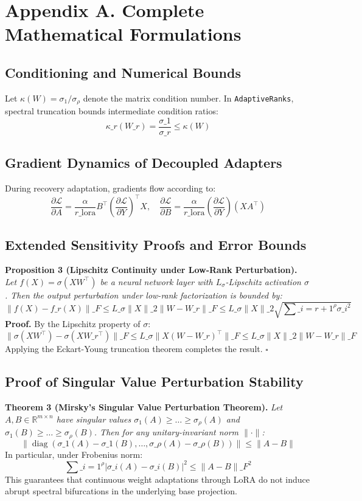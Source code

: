 \section*{Appendix A. Complete Mathematical Formulations}

\subsection*{Conditioning and Numerical Bounds}
Let $\kappa(W) = \sigma_1 / \sigma_\rho$ denote the matrix condition number. In \texttt{AdaptiveRanks}, spectral truncation bounds intermediate condition ratios:
\[
\kappa\_r(W\_r) = \frac{\sigma\_1}{\sigma\_r} \le \kappa(W)
\]

\subsection*{Gradient Dynamics of Decoupled Adapters}
During recovery adaptation, gradients flow according to:
\[
\frac{\partial \mathcal{L}}{\partial A} = \frac{\alpha}{r\_{\text{lora}}} B^\top \left( \frac{\partial \mathcal{L}}{\partial Y} \right)^\top X, \quad \frac{\partial \mathcal{L}}{\partial B} = \frac{\alpha}{r\_{\text{lora}}} \left( \frac{\partial \mathcal{L}}{\partial Y} \right) (X A^\top)
\]

\subsection*{Extended Sensitivity Proofs and Error Bounds}
\textbf{Proposition 3 (Lipschitz Continuity under Low-Rank Perturbation).} \textit{Let $f(X) = \sigma(X W^\top)$ be a neural network layer with $L_\sigma$-Lipschitz activation $\sigma$. Then the output perturbation under low-rank factorization is bounded by:}
\[
\|f(X) - f\_r(X)\|\_F \le L\_\sigma \|X\|\_2 \|W - W\_r\|\_F \le L\_\sigma \|X\|\_2 \sqrt{\sum\_{i=r+1}^\rho \sigma\_i^2}
\]
\textbf{Proof.} By the Lipschitz property of $\sigma$:
\[
\|\sigma(X W^\top) - \sigma(X W\_r^\top)\|\_F \le L\_\sigma \|X (W - W\_r)^\top\|\_F \le L\_\sigma \|X\|\_2 \|W - W\_r\|\_F
\]
Applying the Eckart-Young truncation theorem completes the result. $\square$

\subsection*{Proof of Singular Value Perturbation Stability}
\textbf{Theorem 3 (Mirsky's Singular Value Perturbation Theorem).} \textit{Let $A, B \in \mathbb{R}^{m \times n}$ have singular values $\sigma_1(A) \ge \dots \ge \sigma_\rho(A)$ and $\sigma_1(B) \ge \dots \ge \sigma_\rho(B)$. Then for any unitary-invariant norm $\|\cdot\|$:}
\[
\left\| \operatorname{diag}(\sigma\_1(A) - \sigma\_1(B), \dots, \sigma\_\rho(A) - \sigma\_\rho(B)) \right\| \le \|A - B\|
\]
In particular, under Frobenius norm:
\[
\sum\_{i=1}^\rho |\sigma\_i(A) - \sigma\_i(B)|^2 \le \|A - B\|\_F^2
\]
This guarantees that continuous weight adaptations through LoRA do not induce abrupt spectral bifurcations in the underlying base projection.

